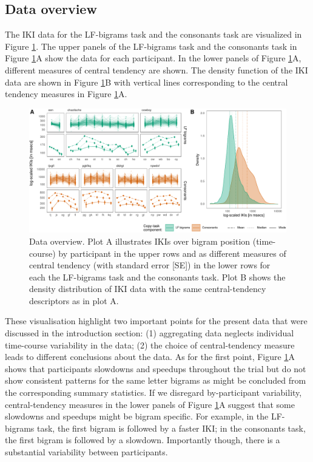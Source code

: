 \documentclass[
  english,
  man,mask,floatsintext]{apa7}
\begin{document}
\hypertarget{data-overview}{%
\subsection{Data overview}\label{data-overview}}

The IKI data for the LF-bigrams task and the consonants task are visualized in Figure \ref{fig:descriptives}. The upper panels of the LF-bigrams task and the consonants task in Figure \ref{fig:descriptives}A show the data for each participant. In the lower panels of Figure \ref{fig:descriptives}A, different measures of central tendency are shown. The density function of the IKI data are shown in Figure \ref{fig:descriptives}B with vertical lines corresponding to the central tendency measures in Figure \ref{fig:descriptives}A.

\begin{landscape}
\begin{figure}[bp!]

{\centering \includegraphics{report_v2_files/figure-latex/descriptives-1} 

}

\caption{Data overview. Plot A illustrates IKIs over bigram position (time-course) by participant in the upper rows and as different measures of central tendency (with standard error [SE]) in the lower rows for each the LF-bigrams task and the consonants task. Plot B shows the density distribution of IKI data with the same central-tendency descriptors as in plot A.}\label{fig:descriptives}
\end{figure}
\end{landscape}

These visualisation highlight two important points for the present data that were discussed in the introduction section: (1) aggregating data neglects individual time-course variability in the data; (2) the choice of central-tendency measure leads to different conclusions about the data. As for the first point, Figure \ref{fig:descriptives}A shows that participants slowdowns and speedups throughout the trial but do not show consistent patterns for the same letter bigrams as might be concluded from the corresponding summary statistics. If we disregard by-participant variability, central-tendency measures in the lower panels of Figure \ref{fig:descriptives}A suggest that some slowdowns and speedups might be bigram specific. For example, in the LF-bigrams task, the first bigram is followed by a faster IKI; in the consonants task, the first bigram is followed by a slowdown. Importantly though, there is a substantial variability between participants.
\end{document}
